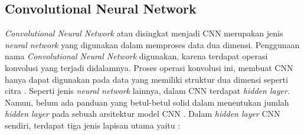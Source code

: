 

\subsection{Convolutional Neural Network}


\emph{Convolutional Neural Network} atau disingkat menjadi CNN merupakan jenis \emph{neural network} yang digunakan dalam memproses data dua dimensi. Penggunaan nama \emph{Convolutional Neural Network} digunakan, karena terdapat operasi konvolusi yang terjadi didalamnya. Proses operasi konvolusi ini, membuat CNN hanya dapat digunakan pada data yang memiliki struktur dua dimensi seperti citra \parencite{IWayan2016}. Seperti jenis \emph{neural network} lainnya, dalam CNN terdapat \emph{hidden layer}. Namun, belum ada panduan yang betul-betul solid dalam menentukan jumlah \emph{hidden layer} pada sebuah arsitektur model CNN \parencite{MBernico}. Dalam \emph{hidden layer} CNN sendiri, terdapat tiga jenis lapisan utama yaitu :

